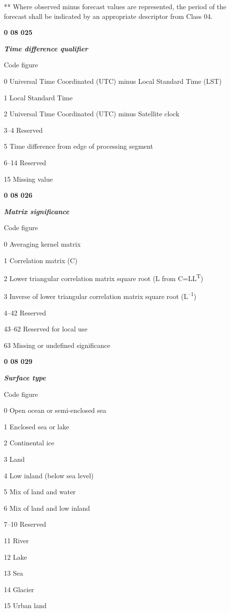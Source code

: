 ** Where observed minus forecast values are represented, the period of the forecast shall be indicated by an appropriate descriptor from Class 04.

\textbf{0 08 025}

\emph{\textbf{Time difference qualifier}}

Code figure

0 Universal Time Coordinated (UTC) minus Local Standard Time (LST)

1 Local Standard Time

2 Universal Time Coordinated (UTC) minus Satellite clock

3--4 Reserved

5 Time difference from edge of processing segment

6--14 Reserved

15 Missing value

\textbf{0 08 026}

\emph{\textbf{Matrix significance}}

Code figure

0 Averaging kernel matrix

1 Correlation matrix (C)

2 Lower triangular correlation matrix square root (L from C=LL\textsuperscript{T})

3 Inverse of lower triangular correlation matrix square root (L\textsuperscript{--1})

4--42 Reserved

43--62 Reserved for local use

63 Missing or undefined significance

\textbf{0 08 029}

\emph{\textbf{Surface type}}

Code figure

0 Open ocean or semi-enclosed sea

1 Enclosed sea or lake

2 Continental ice

3 Land

4 Low inland (below sea level)

5 Mix of land and water

6 Mix of land and low inland

7--10 Reserved

11 River

12 Lake

13 Sea

14 Glacier

15 Urban land

